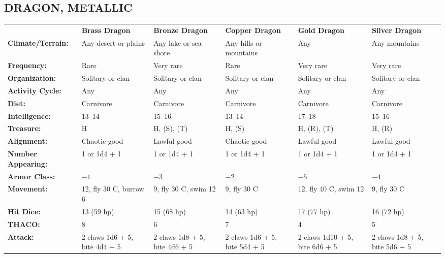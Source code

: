 \noindent \begin{minipage}{\columnwidth}

\subsection*{DRAGON, METALLIC}

\noindent \begin{tabular}{p{}g{.13\columnwidth}p{.14\columnwidth}g{.14\columnwidth}p{.13\columnwidth}g{.13\columnwidth}}
				& \textbf{Brass Dragon}	& \textbf{Bronze Dragon}	& \textbf{Copper Dragon}	& \textbf{Gold Dragon}	& \textbf{Silver Dragon}	\\
\textbf{Climate/Terrain:}	& Any desert or plains		& Any lake or sea shore		& Any hills or mountains		& Any		& Any mountains		\\
\textbf{Frequency:} 		& Rare		& Very rare		& Rare		& Very rare		& Very rare		\\
\textbf{Organization:} 		& Solitary or clan	& Solitary or clan	& Solitary or clan	& Solitary or clan	& Solitary or clan	\\
\textbf{Activity Cycle:} 	& Any			& Any			& Any			& Any			& Any	\\
\textbf{Diet:} 				& Carnivore		& Carnivore		& Carnivore		& Carnivore		& Carnivore	\\
\textbf{Intelligence:} 		& 13--14		& 15--16		& 13--14		& 17--18		& 15--16		\\
\textbf{Treasure:} 			& H		& H, (S), (T)		& H, (S)		& H, (R), (T)		& H, (R)		\\
\textbf{Alignment:} 		& Chaotic good		& Lawful good		& Chaotic good		& Lawful good		& Lawful good		\\
\hline
\textbf{Number Appearing:} 	& 1 or 1d4 + 1		& 1 or 1d4 + 1		& 1 or 1d4 + 1		& 1 or 1d4 + 1		& 1 or 1d4 + 1	\\
\textbf{Armor Class:} 		& $-1$		& $-3$		& $-2$		& $-5$		& $-4$		\\
\textbf{Movement:} 			& 12, fly 30 C, burrow 6		& 9, fly 30 C, swim 12		& 9, fly 30 C		& 12, fly 40 C, swim 12		& 9, fly 30 C		\\
\textbf{Hit Dice:} 			& 13 (59 hp)		& 15 (68 hp)		& 14 (63 hp)		& 17 (77 hp)		& 16 (72 hp)		\\
\textbf{THACO:} 			& 8		& 6		& 7		& 4		& 5		\\
\textbf{Attack:} 			& 2 claws 1d6 + 5, bite 4d4 + 5	& 2 claws 1d8 + 5, bite 4d6 + 5	& 2 claws 1d6 + 5, bite 5d4 + 5	& 2 claws 1d10 + 5, bite 6d6 + 5	& 2 claws 1d8 + 5, bite 5d6 + 5	\\

\end{tabular}
\end{minipage}
